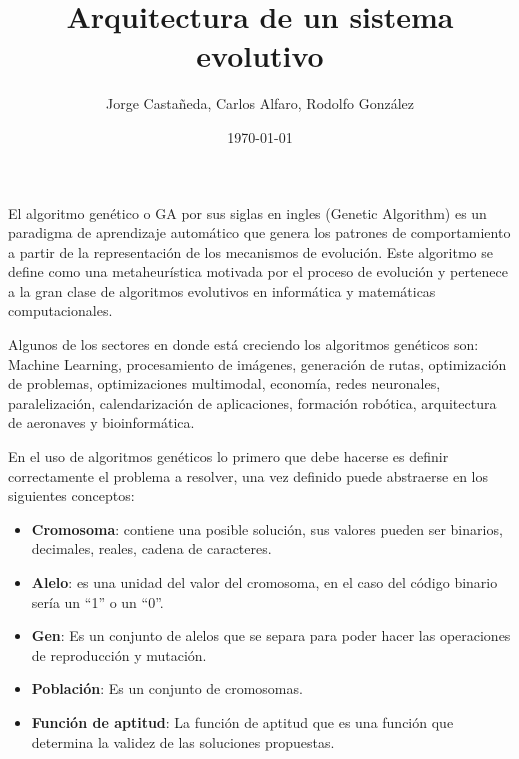 \documentclass[10pt,twocolumn,a4paper]{articuloAPA}
\author{Jorge Castañeda, Carlos Alfaro, Rodolfo González}
\title{Arquitectura de un sistema evolutivo}%
\date{\today}
\begin{document}

El algoritmo genético o GA por sus siglas en ingles (Genetic Algorithm) es un paradigma de aprendizaje automático que genera los patrones de comportamiento a partir de la representación de los mecanismos de evolución. Este algoritmo se define como una metaheurística motivada por el proceso de evolución y pertenece a la gran clase de algoritmos evolutivos en informática y matemáticas computacionales.

Algunos de los sectores en donde está creciendo los algoritmos genéticos son: Machine Learning, procesamiento de imágenes, generación de rutas, optimización de problemas, optimizaciones multimodal, economía, redes neuronales, paralelización, calendarización de aplicaciones, formación robótica, arquitectura de aeronaves y bioinformática.

En el uso de algoritmos genéticos lo primero que debe hacerse es definir correctamente el problema a resolver, una vez definido puede abstraerse en los siguientes conceptos:

\begin{itemize}
  \item \textbf{Cromosoma}: contiene una posible solución, sus valores pueden ser binarios, decimales, reales, cadena de caracteres.
  \item \textbf{Alelo}: es una unidad del valor del cromosoma, en el caso del código binario sería un ``1'' o un ``0''.
  \item \textbf{Gen}: Es un conjunto de alelos que se separa para poder hacer las operaciones de reproducción y mutación.
  \item \textbf{Población}: Es un conjunto de cromosomas.
  \item \textbf{Función de aptitud}: La función de aptitud que es una función que determina la validez de las soluciones propuestas.
\end{itemize} 
\end{document}
